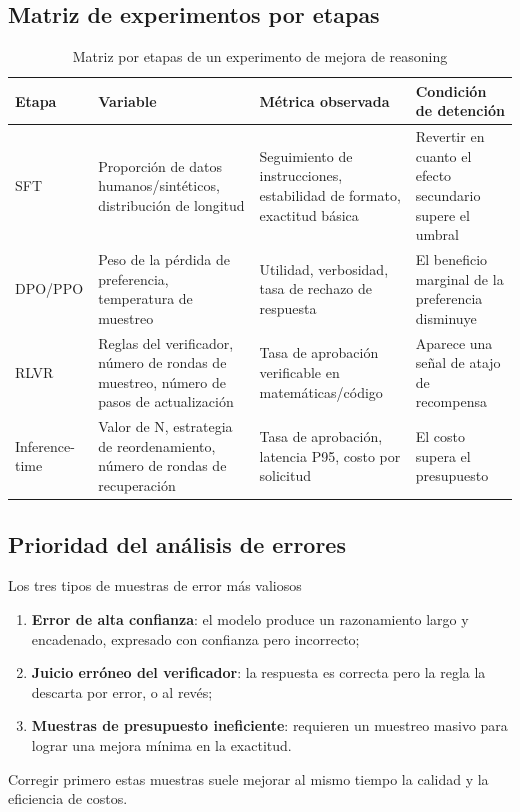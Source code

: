 \subsection{Matriz de experimentos por etapas}
\begin{table}[H]
\centering
\renewcommand{\arraystretch}{1.2}
\begin{tabular}{p{2.8cm}p{3.4cm}p{3.8cm}p{3.0cm}}
\toprule
\textbf{Etapa} & \textbf{Variable} & \textbf{Métrica observada} & \textbf{Condición de detención} \\
\midrule
SFT & Proporción de datos humanos/sintéticos, distribución de longitud & Seguimiento de instrucciones, estabilidad de formato, exactitud básica & Revertir en cuanto el efecto secundario supere el umbral \\
DPO/PPO & Peso de la pérdida de preferencia, temperatura de muestreo & Utilidad, verbosidad, tasa de rechazo de respuesta & El beneficio marginal de la preferencia disminuye \\
RLVR & Reglas del verificador, número de rondas de muestreo, número de pasos de actualización & Tasa de aprobación verificable en matemáticas/código & Aparece una señal de atajo de recompensa \\
Inference-time & Valor de N, estrategia de reordenamiento, número de rondas de recuperación & Tasa de aprobación, latencia P95, costo por solicitud & El costo supera el presupuesto \\
\bottomrule
\end{tabular}
\caption{Matriz por etapas de un experimento de mejora de reasoning}
\end{table}

\subsection{Prioridad del análisis de errores}
\begin{knowledgebox}{Los tres tipos de muestras de error más valiosos}
\begin{enumerate}
    \item \textbf{Error de alta confianza}: el modelo produce un razonamiento largo y encadenado, expresado con confianza pero incorrecto;
    \item \textbf{Juicio erróneo del verificador}: la respuesta es correcta pero la regla la descarta por error, o al revés;
    \item \textbf{Muestras de presupuesto ineficiente}: requieren un muestreo masivo para lograr una mejora mínima en la exactitud.
\end{enumerate}
Corregir primero estas muestras suele mejorar al mismo tiempo la calidad y la eficiencia de costos.
\end{knowledgebox}

